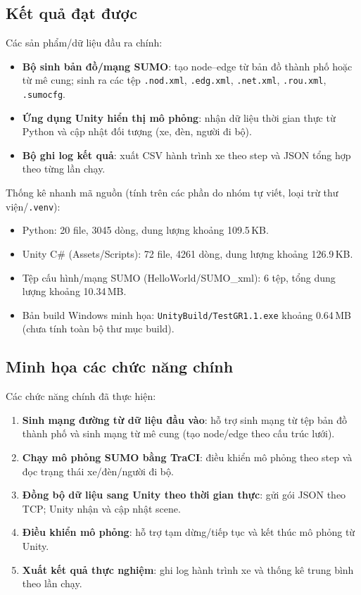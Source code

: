 \documentclass[../DoAn.tex]{subfiles}
\begin{document}
\subsection{Kết quả đạt được}
Các sản phẩm/dữ liệu đầu ra chính:
\begin{itemize}
	\item \textbf{Bộ sinh bản đồ/mạng SUMO}: tạo node--edge từ bản đồ thành phố hoặc từ mê cung; sinh ra các tệp \texttt{.nod.xml}, \texttt{.edg.xml}, \texttt{.net.xml}, \texttt{.rou.xml}, \texttt{.sumocfg}.
	\item \textbf{Ứng dụng Unity hiển thị mô phỏng}: nhận dữ liệu thời gian thực từ Python và cập nhật đối tượng (xe, đèn, người đi bộ).
	\item \textbf{Bộ ghi log kết quả}: xuất CSV hành trình xe theo step và JSON tổng hợp theo từng lần chạy.
\end{itemize}

Thống kê nhanh mã nguồn (tính trên các phần do nhóm tự viết, loại trừ thư viện/\texttt{.venv}):
\begin{itemize}
	\item Python: 20 file, 3045 dòng, dung lượng khoảng 109.5\,KB.
	\item Unity C\# (Assets/Scripts): 72 file, 4261 dòng, dung lượng khoảng 126.9\,KB.
	\item Tệp cấu hình/mạng SUMO (HelloWorld/SUMO\_xml): 6 tệp, tổng dung lượng khoảng 10.34\,MB.
	\item Bản build Windows minh họa: \texttt{UnityBuild/TestGR1.1.exe} khoảng 0.64\,MB (chưa tính toàn bộ thư mục build).
\end{itemize}

\subsection{Minh họa các chức năng chính}
Các chức năng chính đã thực hiện:
\begin{enumerate}
	\item \textbf{Sinh mạng đường từ dữ liệu đầu vào}: hỗ trợ sinh mạng từ tệp bản đồ thành phố và sinh mạng từ mê cung (tạo node/edge theo cấu trúc lưới).
	\item \textbf{Chạy mô phỏng SUMO bằng TraCI}: điều khiển mô phỏng theo step và đọc trạng thái xe/đèn/người đi bộ.
	\item \textbf{Đồng bộ dữ liệu sang Unity theo thời gian thực}: gửi gói JSON theo TCP; Unity nhận và cập nhật scene.
	\item \textbf{Điều khiển mô phỏng}: hỗ trợ tạm dừng/tiếp tục và kết thúc mô phỏng từ Unity.
	\item \textbf{Xuất kết quả thực nghiệm}: ghi log hành trình xe và thống kê trung bình theo lần chạy.
\end{enumerate}
\end{document}
